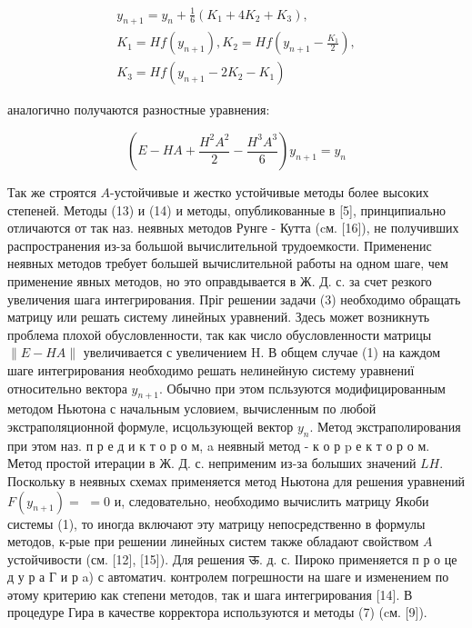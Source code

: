 \documentclass[10pt]{article}
\begin{document}
\[

\begin{gathered}

y_{n+1}=y_{n}+\frac{1}{6}\left(K_{1}+4 K_{2}+K_{3}\right), \\

K_{1}=H f\left(y_{n+1}\right), K_{2}=H f\left(y_{n+1}-\frac{K_{1}}{2}\right), \\

K_{3}=H f\left(y_{n+1}-2 K_{2}-K_{1}\right)

\end{gathered}

\]



аналогично получаются разностные уравнения:



\[

\left(E-H A+\frac{H^{2} A^{2}}{2}-\frac{H^{3} A^{3}}{6}\right) y_{n+1}=y_{n}

\]



Так же строятся $A$-устойчивые и жестко устойчивые методы более высоких степеней. Методы (13) и (14) и методы, опубликованные в [5], принципиально отличаются от так наз. неявных методов Рунге - Кутта (cм. [16]), не получивших распространения из-за большой вычислительной трудоемкости. Примененис неявных методов требует большей вычислительной работы на одном шаге, чем применение явных методов, но это оправдывается в Ж. Д. с. за счет резкого увеличения шага интегрирования. Пріг решении задачи (3) необходимо обращать матрицу или решать систему линейных уравнений. Здесь может возникнуть проблема плохой обусловленности, так как число обусловленности матрицы $\|E-H A\|$ увеличивается с увеличением H. В общем случае (1) на каждом шаге интегрирования необходимо решать нелинейную систему уравнениї относительно вектора $y_{n+1}$. Обычно при этом псльзуются модифицированным методом Ньютона с начальным условием, вычисленным по любой экстраполяционной формуле, исцользующей вектор $y_{n}$. Метод экстраполирования при этом наз. п р е д и к т о р о м, a неявный метод - к о р p е к т о р о м. Метод простой итерации в Ж. Д. с. неприменим из-за болыших значений $L H$. Поскольку в неявных схемах применяется метод Ньютона для решения уравнений $F\left(y_{n+1}\right)=$ $=0$ и, следовательно, необходимо вычислить матрицу Якоби системы (1), то иногда включают эту матрицу непосредственно в формулы методов, к-рые при решении линейных систем также обладают свойством $A$ устойчивости (см. [12], [15]). Для решения ऊ. д. с. ІІироко применяется п р о це д у р а Г и р a) с автоматич. контролем погрешности на шаге и изменением по әтому критерию как степени методов, так и шага интегрирования [14]. В процедуре Гира в качестве корректора используются и методы (7) (cм. [9]).
\end{document}
